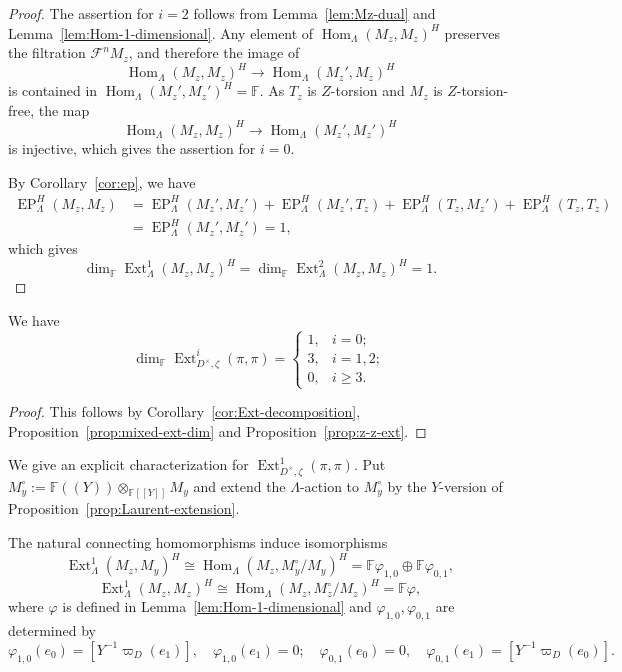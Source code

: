 \documentclass[11pt,a4paper]{article} %
\def\FF{\mathbb{F}}
\def\cF{\mathcal{F}}
\def\dim{\operatorname{dim}}
\def\EP{\operatorname{EP}}
\def\Ext{\operatorname{Ext}} %
\def\Hom{\operatorname{Hom}}
\begin{document}
\begin{proof}
    The assertion for $i=2$ follows from Lemma~\ref{lem:Mz-dual} and Lemma~\ref{lem:Hom-1-dimensional}. Any element of $\Hom_{\Lambda}(M_z,M_z)^{H}$ preserves the filtration $\cF^nM_z$, and therefore the image of
    \[
    \Hom_{\Lambda}(M_z,M_z)^{H}\longrightarrow\Hom_{\Lambda}(M_z',M_z)^{H}
    \]
    is contained in $\Hom_{\Lambda}(M_z',M_z')^{H}=\FF$. As $T_z$ is $Z$-torsion and $M_z$ is $Z$-torsion-free, the map
    \[
    \Hom_{\Lambda}(M_z,M_z)^{H}\longrightarrow\Hom_{\Lambda}(M_z',M_z')^{H}
    \]
    is injective, which gives the assertion for $i=0$.

    By Corollary~\ref{cor:ep}, we have
    \begin{align*}
    \EP_\Lambda^H(M_z,M_z)&=\EP_\Lambda^H(M_z',M_z')+\EP_\Lambda^H(M_z',T_z)+\EP_\Lambda^H(T_z,M_z')+\EP_\Lambda^H(T_z,T_z)\\
    &=\EP_\Lambda^H(M_z',M_z')=1,
    \end{align*}
    which gives
    \[
    \dim_\FF\Ext^1_{\Lambda}(M_z,M_z)^{H}=\dim_\FF\Ext^2_{\Lambda}(M_z,M_z)^{H}=1.
    \]
\end{proof}

\begin{theorem}\label{thm:self-extension}
    We have
        \[
    \dim_\FF\Ext^i_{D^\times,\zeta}(\pi,\pi)= 
    \begin{cases}
        1,&i=0;\\
        3,&i=1,2;\\
        0,&i\ge3.
    \end{cases}
    \]
\end{theorem}

\begin{proof}
    This follows by Corollary~\ref{cor:Ext-decomposition}, Proposition~\ref{prop:mixed-ext-dim} and Proposition~\ref{prop:z-z-ext}. 
\end{proof}

We give an explicit characterization for $\Ext^1_{D^\times,\zeta}(\pi,\pi)$. Put $M_y^\circ:=\FF((Y))\otimes_{\FF[[Y]]} M_y$ and extend the $\Lambda$-action to $M_y^\circ$ by the $Y$-version of Proposition~\ref{prop:Laurent-extension}.

\begin{proposition}\label{prop:ext-explicit}
    The natural connecting homomorphisms induce isomorphisms
    \[
    \Ext^1_{\Lambda}(M_z,M_y)^H\cong\Hom_{\Lambda}(M_z,M_y^\circ/M_y)^H=\FF\varphi_{1,0}\oplus\FF\varphi_{0,1},
    \]
    \[
    \Ext^1_{\Lambda}(M_z,M_z)^H\cong\Hom_{\Lambda}(M_z,M_z^\circ/M_z)^H=\FF\varphi,
    \]
    where $\varphi$ is defined in Lemma~\ref{lem:Hom-1-dimensional} and $\varphi_{1,0},\varphi_{0,1}$ are determined by
    \[
    \varphi_{1,0}(e_0)=[Y^{-1}\varpi_D(e_1)],\quad\varphi_{1,0}(e_1)=0;\quad\varphi_{0,1}(e_0)=0,\quad\varphi_{0,1}(e_1)=[Y^{-1}\varpi_D(e_0)].
    \]
\end{proposition}
\end{document}
